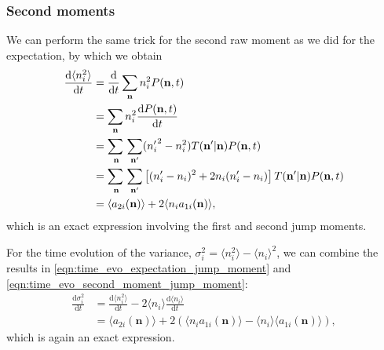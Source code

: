 \documentclass[a4paper,11pt]{article}
\numberwithin{equation}{section}
\newcommand{\diff}[2]{\frac{\mathrm{d} #1}{\mathrm{d} #2}}
\newcommand{\V}[1]{\mathbf{#1}}
\newcommand{\E}[1]{\langle #1 \rangle}
\begin{document}
\subsubsection{Second moments}
We can perform the same trick for the second raw moment as we did for the
expectation, by which we obtain
\begin{equation}
    \begin{aligned}
        \diff{\E{n_i^2}}{t} &= \diff{}{t} \sum_{\V{n}} n_i^2 P(\V{n},t)\\
        &= \sum_{\V{n}} n_i^2 \diff{P(\V{n},t)}{t}\\
        &= \adjustlimits\sum_{\V{n}} \sum_{\V{n}'} ({n_i'}^2 - n_i^2) T(\V{n}' |
        \V{n}) P(\V{n},t)\\
        &= \adjustlimits\sum_{\V{n}} \sum_{\V{n}'} \left[ (n_i' - n_i)^2 + 2n_i(n_i'
        - n_i) \right] T(\V{n}' | \V{n}) P(\V{n},t)\\
        &= \E{a_{2i}(\V{n})} + 2 \E{n_i a_{1i}(\V{n})},
    \end{aligned}
    \label{eqn:time_evo_second_moment_jump_moment}
\end{equation}
which is an exact expression involving the first and second jump moments.

For the time evolution of the variance, \(\sigma_i^2 = \E{n_i^2} - \E{n_i}^2\),
we can combine the results in \eqref{eqn:time_evo_expectation_jump_moment} and
\eqref{eqn:time_evo_second_moment_jump_moment}:
\begin{equation}
    \begin{aligned}
        \diff{\sigma_i^2}{t} &= \diff{\E{n_i^2}}{t} - 2 \E{n_i}\diff{\E{n_i}}{t}\\
        &= \E{a_{2i}(\V{n})} + 2\left( \E{n_i a_{1i}(\V{n})} - \E{n_i}
        \E{a_{1i}(\V{n})} \right),
    \end{aligned}
    \label{eqn:time_evo_variance_jump_moment}
\end{equation}
which is again an exact expression.
\end{document}
